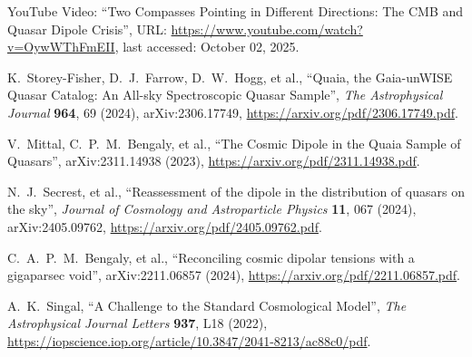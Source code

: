\documentclass{article}
\begin{document}
	\begin{thebibliography}{9}
		
		YouTube Video: ``Two Compasses Pointing in Different Directions: The CMB and Quasar Dipole Crisis'', 
		URL: \url{https://www.youtube.com/watch?v=OywWThFmEII}, 
		last accessed: October 02, 2025.
		
		K.~Storey-Fisher, D.~J.~Farrow, D.~W.~Hogg, et al.,
		``Quaia, the Gaia-unWISE Quasar Catalog: An All-sky Spectroscopic Quasar Sample'',
		\emph{The Astrophysical Journal} \textbf{964}, 69 (2024),
		arXiv:2306.17749,
		\url{https://arxiv.org/pdf/2306.17749.pdf}.
		
		V.~Mittal, C.~P.~M.~Bengaly, et al.,
		``The Cosmic Dipole in the Quaia Sample of Quasars'',
		arXiv:2311.14938 (2023),
		\url{https://arxiv.org/pdf/2311.14938.pdf}.
		
		N.~J.~Secrest, et al.,
		``Reassessment of the dipole in the distribution of quasars on the sky'',
		\emph{Journal of Cosmology and Astroparticle Physics} \textbf{11}, 067 (2024),
		arXiv:2405.09762,
		\url{https://arxiv.org/pdf/2405.09762.pdf}.
		
		C.~A.~P.~M.~Bengaly, et al.,
		``Reconciling cosmic dipolar tensions with a gigaparsec void'',
		arXiv:2211.06857 (2024),
		\url{https://arxiv.org/pdf/2211.06857.pdf}.
		
		A.~K.~Singal,
		``A Challenge to the Standard Cosmological Model'',
		\emph{The Astrophysical Journal Letters} \textbf{937}, L18 (2022),
		\url{https://iopscience.iop.org/article/10.3847/2041-8213/ac88c0/pdf}.
		
	\end{thebibliography}
	
\end{document}
